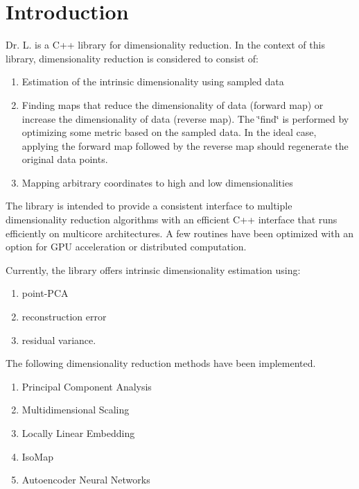 \hypertarget{index_intro}{}\section{Introduction}\label{index_intro}
Dr. L. is a C++ library for dimensionality reduction. In the context of this library, dimensionality reduction is considered to consist of: \begin{enumerate}
\end{enumerate}
\begin{enumerate}
\item Estimation of the intrinsic dimensionality using sampled data\item Finding maps that reduce the dimensionality of data (forward map) or increase the dimensionality of data (reverse map). The \char`\"{}find\char`\"{} is performed by optimizing some metric based on the sampled data. In the ideal case, applying the forward map followed by the reverse map should regenerate the original data points.\item Mapping arbitrary coordinates to high and low dimensionalities \end{enumerate}


The library is intended to provide a consistent interface to multiple dimensionality reduction algorithms with an efficient C++ interface that runs efficiently on multicore architectures. A few routines have been optimized with an option for GPU acceleration or distributed computation.

Currently, the library offers intrinsic dimensionality estimation using: \begin{enumerate}
\end{enumerate}
\begin{enumerate}
\item point-PCA\item reconstruction error\item residual variance. \end{enumerate}


The following dimensionality reduction methods have been implemented. \begin{enumerate}
\end{enumerate}
\begin{enumerate}
\item Principal Component Analysis\item Multidimensional Scaling\item Locally Linear Embedding\item Iso\-Map\item Autoencoder Neural Networks \end{enumerate}


